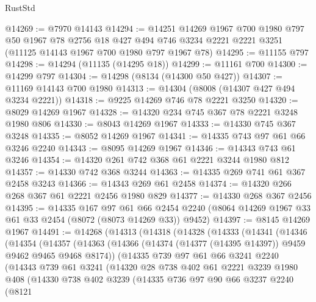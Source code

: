 \begin{lexlean}{RustStd}
\begin{coremodule}
{\begin{coremodule}
{{{{{{{{{{{{{{{{{{{{{{{{{{{{{{{{{{{{{{{{{{{{{{{{{{{{{@14269 := @7970 @14143
@14294 := @14251
    @14269
    @1967
    @700
    @1980
    @797
    @50
    @1967
    @78
    @2756
    @18
    @427
    @494
    @746
    @3234
    @2221
    @2221
    @3251
    (@11125 @14143 @1967 @700 @1980 @797 @1967 @78)
@14295 := @11155 @797
@14298 := @14294 (@11135 (@14295 @18))
@14299 := @11161 @700
@14300 := @14299 @797
@14304 := @14298 (@8134 (@14300 @50 @427))
@14307 := @11169 @14143 @700 @1980
@14313 := @14304 (@8008 (@14307 @427 @494 @3234 @2221))
@14318 := @9225 @14269 @746 @78 @2221 @3250
@14320 := @8029 @14269 @1967
@14328 := @14320 @234 @745 @367 @78 @2221 @3248 @1980 @806
@14330 := @8043 @14269 @1967
@14333 := @14330 @745 @367 @3248
@14335 := @8052 @14269 @1967
@14341 := @14335 @743 @97 @61 @66 @3246 @2240
@14343 := @8095 @14269 @1967
@14346 := @14343 @743 @61 @3246
@14354 := @14320 @261 @742 @368 @61 @2221 @3244 @1980 @812
@14357 := @14330 @742 @368 @3244
@14363 := @14335 @269 @741 @61 @367 @2458 @3243
@14366 := @14343 @269 @61 @2458
@14374 := @14320 @266 @268 @367 @61 @2221 @2456 @1980 @829
@14377 := @14330 @268 @367 @2456
@14395 := @14335
    @167
    @97
    @61
    @66
    @2454
    @2240
    (@8064 @14269 @1967 @33 @61 @33 @2454 (@8072 (@8073 @14269 @33)) @9452)
@14397 := @8145 @14269 @1967
@14491 := @14268
    (@14313
      (@14318
        (@14328
          (@14333
            (@14341
              (@14346
                (@14354
                  (@14357
                    (@14363
                      (@14366 (@14374 (@14377 (@14395 @14397)) @9459 @9462 @9465 @9468 @8174))
                      (@14335
                        @739
                        @97
                        @61
                        @66
                        @3241
                        @2240
                        (@14343
                          @739
                          @61
                          @3241
                          (@14320
                            @28
                            @738
                            @402
                            @61
                            @2221
                            @3239
                            @1980
                            @408
                            (@14330
                              @738
                              @402
                              @3239
                              (@14335
                                @736
                                @97
                                @90
                                @66
                                @3237
                                @2240
                                (@8121
}}}}}}}}}}}}}}}}}}}}}}}}}}}}}}}}}}}}}}}}}}}}}}}}}}}}}
\end{coremodule}}
\end{coremodule}
\end{lexlean}
